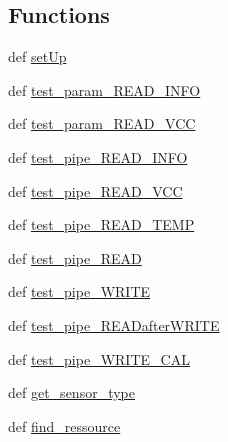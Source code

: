 \subsection*{Functions}
\begin{DoxyCompactItemize}
\item 
def \hyperlink{namespacetest_ab4d49aff0f528d5af5e22c8fcdbf12df}{set\-Up}
\item 
def \hyperlink{namespacetest_a5ed64defd9aba0e1f1609e24ee2c52bf}{test\-\_\-param\-\_\-\-R\-E\-A\-D\-\_\-\-I\-N\-F\-O}
\item 
def \hyperlink{namespacetest_af586e1f084e70d40b083d474abdd02ed}{test\-\_\-param\-\_\-\-R\-E\-A\-D\-\_\-\-V\-C\-C}
\item 
def \hyperlink{namespacetest_a3d23a6c3034532a5d3dba851ff48c7d9}{test\-\_\-pipe\-\_\-\-R\-E\-A\-D\-\_\-\-I\-N\-F\-O}
\item 
def \hyperlink{namespacetest_a78b90a6b2aee85e91e4b604dec619ad0}{test\-\_\-pipe\-\_\-\-R\-E\-A\-D\-\_\-\-V\-C\-C}
\item 
def \hyperlink{namespacetest_aeed0f3e6739cf2d5f43519442ba49fa1}{test\-\_\-pipe\-\_\-\-R\-E\-A\-D\-\_\-\-T\-E\-M\-P}
\item 
def \hyperlink{namespacetest_a6914c11d0992466640f9f1efeeb474dd}{test\-\_\-pipe\-\_\-\-R\-E\-A\-D}
\item 
def \hyperlink{namespacetest_ae92dfa92b013577a1f3cde7ed5becf71}{test\-\_\-pipe\-\_\-\-W\-R\-I\-T\-E}
\item 
def \hyperlink{namespacetest_a7803997ab7cd73274fbd69f3df3da653}{test\-\_\-pipe\-\_\-\-R\-E\-A\-Dafter\-W\-R\-I\-T\-E}
\item 
def \hyperlink{namespacetest_abb66dbb476751615efddf34a9a765af9}{test\-\_\-pipe\-\_\-\-W\-R\-I\-T\-E\-\_\-\-C\-A\-L}
\item 
def \hyperlink{namespacetest_a723a5231a237d79a789f4ad357e7d6e0}{get\-\_\-sensor\-\_\-type}
\item 
def \hyperlink{namespacetest_a35e68ee43d084c87754ff150f137dfe4}{find\-\_\-ressource}
\end{DoxyCompactItemize}
